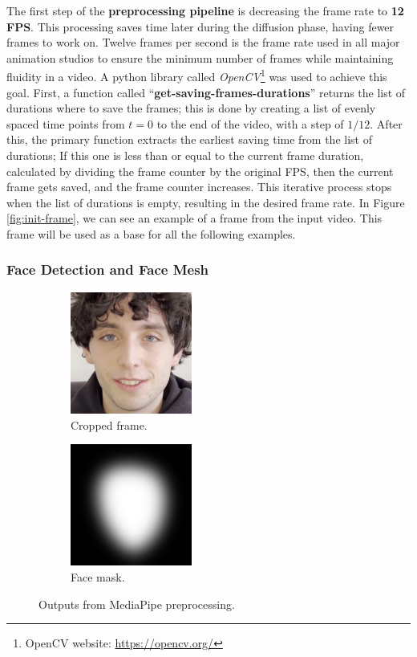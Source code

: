 \documentclass[preprint]{elsarticle}
\begin{document}
The first step of the \textbf{preprocessing pipeline} is decreasing the frame rate to \textbf{12 FPS}. 
This processing saves time later during the diffusion phase, having fewer frames to work on. 
Twelve frames per second is the frame rate used in all major animation studios to ensure the minimum number of 
frames while maintaining fluidity in a video. A python library called \emph{OpenCV}\footnote{OpenCV website: \url{https://opencv.org/}} 
was used to achieve this goal. 
First, a function called ``\textbf{get-saving-frames-durations}'' returns the list of durations where to save the frames; 
this is done by creating a list of evenly spaced time points from $t=0$ to the end of the video, with a step of $1/12$. 
After this, the primary function extracts the earliest saving time from the list of durations; 
If this one is less than or equal to the current frame duration, calculated by dividing the frame counter by the original FPS, 
then the current frame gets saved, and the frame counter increases. This iterative process stops when the list of durations is empty, 
resulting in the desired frame rate. In Figure \ref{fig:init-frame}, we can see an example of a frame from the input video.
This frame will be used as a base for all the following examples.



\subsubsection{Face Detection and Face Mesh} \label{sec:face_detection}

\begin{figure}[H]
	\centering
	\begin{subfigure}[b]{0.5\textwidth}
		\centering
		\includegraphics[width=4cm, keepaspectratio]{img/project_img/cropped.png}
		\caption{Cropped frame.}\label{fig:cropped}
	\end{subfigure}%
	\hfill
	\begin{subfigure}[b]{0.5\textwidth}
		\centering
		\includegraphics[width=4cm, keepaspectratio]{img/project_img/mask-blur.png}
		\caption{Face mask.}\label{fig:mask}
	\end{subfigure}
	\caption{Outputs from MediaPipe preprocessing.}\label{fig:project-mediapipe}
\end{figure}
\end{document}
